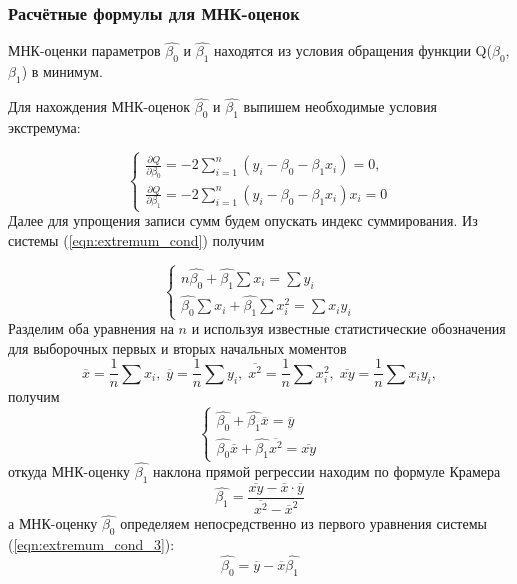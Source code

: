 \documentclass[12pt,a4paper]{article}
\begin{document}
	\subsubsection{Расчётные формулы для МНК-оценок}
	МНК-оценки параметров $\hat{\beta_0}$ и $\hat{\beta_1}$ находятся из условия обращения функции Q($\beta_0$, $\beta_1$) в минимум.
		
	Для нахождения МНК-оценок $\hat{\beta_0}$ и $\hat{\beta_1}$ выпишем необходимые условия экстремума:
	
	
	\begin{equation}\label{eqn:extremum_cond}
	\begin{cases}
	\frac{\partial Q}{\partial \beta_0} = -2 \sum_{i = 1}^{n} (y_i - \beta_0 - \beta_1 x_i) = 0,\\
	\frac{\partial Q}{\partial \beta_1} = -2 \sum_{i = 1}^{n} (y_i - \beta_0 - \beta_1 x_i)x_i = 0
	\end{cases}
	\end{equation}
	Далее для упрощения записи сумм будем опускать индекс суммирования. Из системы (\ref{eqn:extremum_cond}) получим
	
	\begin{equation}\label{eqn:extremum_cond_2}
	\begin{cases}
	n\hat{\beta_0} + \hat{\beta_1} \sum x_i = \sum y_i\\
	\hat{\beta_0}\sum x_i + \hat{\beta_1} \sum x^2_i = \sum x_i y_i
	\end{cases}
	\end{equation}
	Разделим оба уравнения на $n$ и используя известные статистические обозначения для выборочных первых и вторых начальных моментов
	$$\overline{x} = \frac{1}{n} \sum x_i,\; \overline{y} = \frac{1}{n} \sum y_i,\; \overline{x^2} = \frac{1}{n} \sum x^2_i,\; \overline{xy} = \frac{1}{n} \sum x_iy_i,$$
	получим
	\begin{equation}\label{eqn:extremum_cond_3}
	\begin{cases}
	\hat{\beta_0} + \hat{\beta_1}\overline{x} = \overline{y}\\
	\hat{\beta_0}\overline{x} + \hat{\beta_1} \overline{x^2} = \overline{xy}
	\end{cases}
	\end{equation}	
	откуда МНК-оценку $\hat{\beta_1}$ наклона прямой регрессии находим по формуле
	Крамера
	\begin{equation}\label{eqn:beta_1}
	\hat{\beta_1} = \frac{\overline{xy} - \overline{x} \cdot \overline{y}}{\overline{x^2} - {\overline{x}}^2}
	\end{equation}
	а МНК-оценку $\hat{\beta_0}$ определяем непосредственно из первого уравнения системы (\ref{eqn:extremum_cond_3}):
	\begin{equation}\label{eqn:beta_0}
	\hat{\beta_0} = \overline{y} - \overline{x}\hat{\beta_1}
	\end{equation}
	
\end{document}
